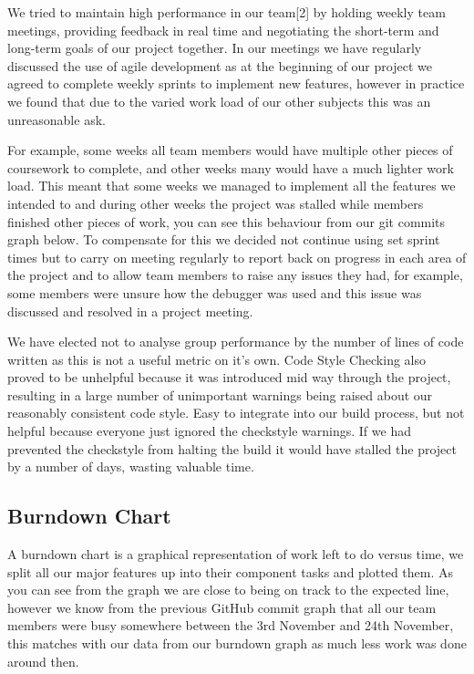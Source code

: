 \documentclass[10pt, a4paper]{article}
\begin{document}
We tried to maintain high performance in our team[2] by holding weekly team meetings, providing feedback in real time and negotiating the short-term and long-term goals of our project together. In our meetings we have regularly discussed the use of agile development as at the beginning of our project we agreed to complete weekly sprints to implement new features, however in practice we found that due to the varied work load of our other subjects this was an unreasonable ask. 

For example, some weeks all team members would have multiple other pieces of coursework to complete, and other weeks many would have a much lighter work load. This meant that some weeks we managed to implement all the features we intended to and during other weeks the project was stalled while members finished other pieces of work, you can see this behaviour from our git commits graph below.
To compensate for this we decided not continue using set sprint times but to carry on meeting regularly to report back on progress in each area of the project and to allow team members to raise any issues they had, for example, some members were unsure how the debugger was used and this issue was discussed and resolved in a project meeting.

We have elected not to analyse group performance by the number of lines of code written as this is not a useful metric on it’s own. Code Style Checking also proved to be unhelpful because it was introduced mid way through the project, resulting in a large number of unimportant warnings being raised about our reasonably consistent code style.
Easy to integrate into our build process, but not helpful because everyone just ignored the checkstyle warnings. If we had prevented the checkstyle from halting the build it would have stalled the project by a number of days, wasting valuable time.

\subsection{Burndown Chart}

A burndown chart is a graphical representation of work left to do versus time, we split all our major features up into their component tasks and plotted them.
As you can see from the graph we are close to being on track to the expected line, however we know from the previous GitHub commit graph that all our team members were busy somewhere between the 3rd November and 24th November, this matches with our data from our burndown graph as much less work was done around then.
\end{document}
